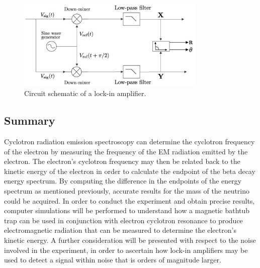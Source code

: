 \documentclass[a4paper,12pt, notitlepage]{article}
\begin{document}
\begin{figure}[t!]
\centering
\includegraphics[width=0.8\textwidth]{pictures/diagramCircuit00.png}
\vspace{-2mm}
\caption{Circuit schematic of a lock-in amplifier.}
\label{fig:fig07}
\end{figure}
\subsection{Summary}
Cyclotron radiation emission spectroscopy can determine the cyclotron frequency of the electron by measuring the frequency of the EM radiation emitted by the electron. The electron's cyclotron frequency may then be related back to the kinetic energy of the electron in order to calculate the endpoint of the beta decay energy spectrum. By computing the difference in the endpoints of the energy spectrum as mentioned previously, accurate results for the mass of the neutrino could be acquired. In order to conduct the experiment and obtain precise results, computer simulations will be performed to understand how a magnetic bathtub trap can be used in conjunction with electron cyclotron resonance to produce electromagnetic radiation that can be measured to determine the electron's kinetic energy. A further consideration will be presented with respect to the noise involved in the experiment, in order to ascertain how lock-in amplifiers may be used to detect a signal within noise that is orders of magnitude larger.
\end{document}
